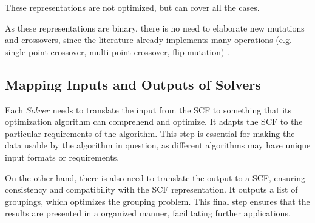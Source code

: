             

            These representations are not optimized, but can cover all the cases.
    
            As these representations are binary, there is no need to elaborate new mutations and crossovers, since the literature already implements many operations (e.g. single-point crossover, multi-point crossover, flip mutation) \cite{galib}.

        
     \subsection{Mapping Inputs and Outputs of Solvers}
        Each $Solver$ needs to translate the input from the SCF to something that its optimization algorithm can comprehend and optimize. It adapts the SCF to the particular requirements of the algorithm. This step is essential for making the data usable by the algorithm in question, as different algorithms may have unique input formats or requirements.

        On the other hand, there is also need to translate the output to a SCF, ensuring consistency and compatibility with the SCF representation. It outputs a list of groupings, which optimizes the grouping problem. This final step ensures that the results are presented in a organized manner, facilitating further applications.